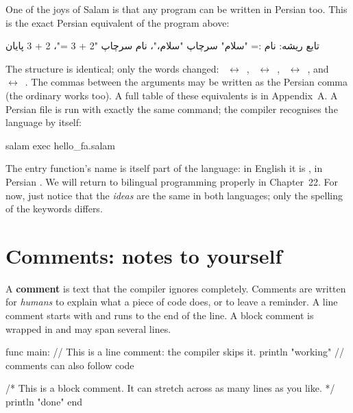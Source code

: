 One of the joys of Salam is that any program can be written in Persian too. This
is the exact Persian equivalent of the program above:

\begin{salamfa}
تابع ریشه:
    نام := "سلام"
    سرچاپ "سلام،"، نام
    سرچاپ "2 + 3 ="، 2 + 3
پایان
\end{salamfa}

The structure is identical; only the words changed:
~$\leftrightarrow$~,
~$\leftrightarrow$~,
~$\leftrightarrow$~, and
~$\leftrightarrow$~. The commas between the
arguments may be written as the Persian comma  (the ordinary
\code{,} works too). A full table of these equivalents is in Appendix~A. A
Persian file is run with exactly the same command; the compiler recognises the
language by itself:

\begin{shell}
salam exec hello_fa.salam
\end{shell}

\begin{note}
The entry function's name is itself part of the language: in English it is
, in Persian . We will return to bilingual
programming properly in Chapter~22. For now, just notice that the \emph{ideas}
are the same in both languages; only the spelling of the keywords differs.
\end{note}

\section{Comments: notes to yourself}

A \textbf{comment} is text that the compiler ignores completely. Comments are
written for \emph{humans} to explain what a piece of code does, or to leave a
reminder. A line comment starts with \code{//} and runs to the end of the line.
A block comment is wrapped in  and may span several lines.

\begin{salamen}
func main:
    // This is a line comment: the compiler skips it.
    println "working"          // comments can also follow code

    /* This is a block comment.
       It can stretch across
       as many lines as you like. */
    println "done"
end
\end{salamen}

